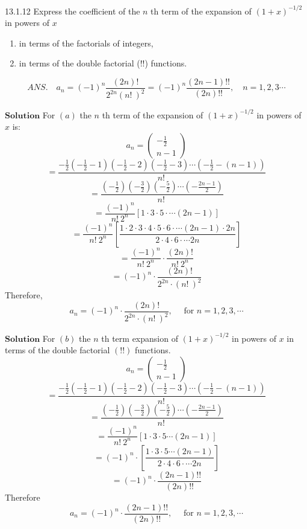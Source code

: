 \newpage

\begin{mybox}{13.1.12}
Express the coefficient of the $n$ th term of the expansion of $(1+x)^{-1 / 2}$ in powers of $x$
\begin{enumerate}[$(a)$]
\item in terms of the factorials of integers,
\item in terms of the double factorial
(!!) functions.
\end{enumerate}
$$
A N S . \quad a_{n}=(-1)^{n} \frac{(2 n) !}{2^{2 n}(n! \ )^{2}}=(-1)^{n} \frac{(2 n-1) ! !}{(2 n) ! !}, \quad n=1,2,3  \cdots
$$
\end{mybox}

$\boxed{\textbf{Solution}}$ For $(a)$ the $n$ th term of the expansion of $(1+x)^{-1 / 2}$ in powers of $x$ is:
$$
a_{n}=\left(\begin{array}{c}
-\frac{1}{2} \\
n-1
\end{array}\right)
$$
$$
=\frac{-\frac{1}{2}\left(-\frac{1}{2}-1\right)\left(-\frac{1}{2}-2\right)\left(-\frac{1}{2}-3\right) \cdots\left(-\frac{1}{2}-(n-1)\right)}{n! \ }
$$
$$
=\frac{\left(-\frac{1}{2}\right)\left(-\frac{3}{2}\right)\left(-\frac{5}{2}\right) \cdots\left(-\frac{2 n-1}{2}\right)}{n! \ }
$$
$$
=\frac{(-1)^{n}}{n! \  2^{n}}[1 \cdot 3  \cdot 5  \cdot   \cdots (2 n-1)]
$$
$$
=\frac{(-1)^{n}}{n! \  2^{n}}\left[\frac{1 \cdot 2  \cdot 3  \cdot 4  \cdot 5  \cdot 6  \cdot   \cdots (2 n-1) \cdot 2 n}{2 \cdot 4  \cdot 6  \cdot   \cdots 2 n}\right]
$$
$$=\frac{(-1)^{n}}{n! \  2^{n}} \cdot \frac{(2 n) !}{n! \  2^{n}}$$
$$=(-1)^{n} \cdot \frac{(2 n) !}{2^{2 n} \cdot(n! \ )^{2}}$$
Therefore, 
$$
a_{n}=(-1)^{n} \cdot \frac{(2 n) !}{2^{2 n} \cdot(n! \ )^{2}}, \quad \text { for } n=1,2,3, \cdots
$$

$\boxed{\textbf{Solution}}$ For $(b)$ the $n$ th term expansion of $(1+x)^{-1 / 2}$ in powers of $x$ in terms of the double factorial $(!!)$ functions.
$$
a_{n}=\left(\begin{array}{c}
-\frac{1}{2} \\
n-1
\end{array}\right)
$$
$$
=\frac{-\frac{1}{2}\left(-\frac{1}{2}-1\right)\left(-\frac{1}{2}-2\right)\left(-\frac{1}{2}-3\right) \cdots\left(-\frac{1}{2}-(n-1)\right)}{n! \ }
$$
$$
=\frac{\left(-\frac{1}{2}\right)\left(-\frac{3}{2}\right)\left(-\frac{5}{2}\right) \cdots\left(-\frac{2 n-1}{2}\right)}{n! \ }
$$
$$=\frac{(-1)^{n}}{n! \  2^{n}}[1 \cdot 3  \cdot 5   \cdots (2 n-1)]$$
$$=(-1)^{n} \cdot\left[\frac{1 \cdot 3  \cdot 5   \cdots (2 n-1)}{2 \cdot 4  \cdot 6  \cdot   \cdots 2 n}\right]$$
$$=(-1)^{n} \cdot \frac{(2 n-1) ! !}{(2 n) ! !}$$
Therefore
$$
a_{n}=(-1)^{n} \cdot \frac{(2 n-1) ! !}{(2 n) ! !}, \quad \text { for } n=1,2,3, \cdots
$$

